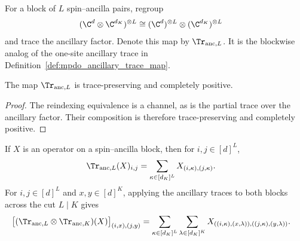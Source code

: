 \begin{definition}
    \label{def:block_ancillary_trace}
    \leanok
    For a block of $L$ spin--ancilla pairs, regroup
    \begin{align}
        (\C^d\otimes\C^{d_K})^{\otimes L}
         & \cong(\C^d)^{\otimes L}
        \otimes(\C^{d_K})^{\otimes L}
        \notag
    \end{align}
    and trace the ancillary factor. Denote this map by
    $\Tr_{\mathrm{anc},L}$. It is the blockwise analog of the
    one-site ancillary trace in
    Definition~\ref{def:mpdo_ancillary_trace_map}.
\end{definition}

\begin{lemma}
    \label{thm:block_ancillary_trace_channel}
    \leanok
    The map $\Tr_{\mathrm{anc},L}$ is trace-preserving and
    completely positive.
\end{lemma}

\begin{proof}\leanok
    The reindexing equivalence is a channel, as is the partial trace over the
    ancillary factor. Their composition is therefore trace-preserving and
    completely positive.
\end{proof}

\begin{lemma}
    \label{thm:block_ancillary_trace_coefficients}
    \leanok
    If $X$ is an operator on a spin--ancilla block, then for
    $i,j\in[d]^L$,
    \begin{align}
        \Tr_{\mathrm{anc},L}(X)_{i,j}
         & =\sum_{\kappa\in[d_K]^L}X_{(i,\kappa),(j,\kappa)}.
        \notag
    \end{align}
    For $i,j\in[d]^L$ and $x,y\in[d]^K$, applying the ancillary traces to
    both blocks across the cut $L\mid K$ gives
    \begin{align}
        \bigl[(\Tr_{\mathrm{anc},L}\otimes
            \Tr_{\mathrm{anc},K})(X)\bigr]_{(i,x),(j,y)}
         & =\sum_{\kappa\in[d_K]^L}\sum_{\lambda\in[d_K]^K}
        X_{((i,\kappa),(x,\lambda)),((j,\kappa),(y,\lambda))}.
        \notag
    \end{align}
\end{lemma}

